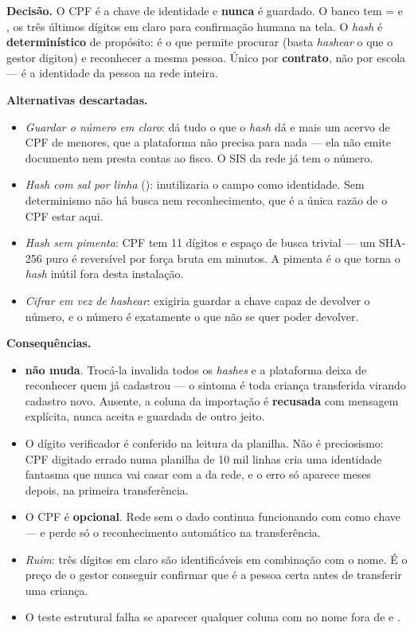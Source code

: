 \textbf{Decisão.} O CPF é a chave de identidade e \textbf{nunca} é guardado. O
banco tem  =  e
, os três últimos dígitos em claro para confirmação humana
na tela. O \emph{hash} é \textbf{determinístico} de propósito: é o que permite
procurar (basta \emph{hashear} o que o gestor digitou) e reconhecer a mesma
pessoa. Único por \textbf{contrato}, não por escola --- é a identidade da pessoa
na rede inteira.

\textbf{Alternativas descartadas.}
\begin{itemize}
  \item \emph{Guardar o número em claro}: dá tudo o que o \emph{hash} dá e mais
    um acervo de CPF de menores, que a plataforma não precisa para nada --- ela
    não emite documento nem presta contas ao fisco. O SIS da rede já tem o número.
  \item \emph{\emph{Hash} com sal por linha} (): inutilizaria o campo
    como identidade. Sem determinismo não há busca nem reconhecimento, que é a
    única razão de o CPF estar aqui.
  \item \emph{\emph{Hash} sem pimenta}: CPF tem 11 dígitos e espaço de busca
    trivial --- um SHA-256 puro é reversível por força bruta em minutos. A pimenta
    é o que torna o \emph{hash} inútil fora desta instalação.
  \item \emph{Cifrar em vez de \emph{hashear}}: exigiria guardar a chave capaz de
    devolver o número, e o número é exatamente o que não se quer poder devolver.
\end{itemize}

\textbf{Consequências.}
\begin{itemize}
  \item {} \textbf{não muda}. Trocá-la invalida todos os
    \emph{hashes} e a plataforma deixa de reconhecer quem já cadastrou --- o
    sintoma é toda criança transferida virando cadastro novo. Ausente, a coluna
     da importação é \textbf{recusada} com mensagem explícita, nunca
    aceita e guardada de outro jeito.
  \item O dígito verificador é conferido na leitura da planilha. Não é
    preciosismo: CPF digitado errado numa planilha de 10 mil linhas cria uma
    identidade fantasma que nunca vai casar com a da rede, e o erro só aparece
    meses depois, na primeira transferência.
  \item O CPF é \textbf{opcional}. Rede sem o dado continua funcionando com
     como chave --- e perde só o reconhecimento
    automático na transferência.
  \item \emph{Ruim}: três dígitos em claro são identificáveis em combinação com o
    nome. É o preço de o gestor conseguir confirmar que é a pessoa certa antes de
    transferir uma criança.
  \item O teste estrutural  falha se aparecer
    qualquer coluna com  no nome fora de  e
    .
\end{itemize}

